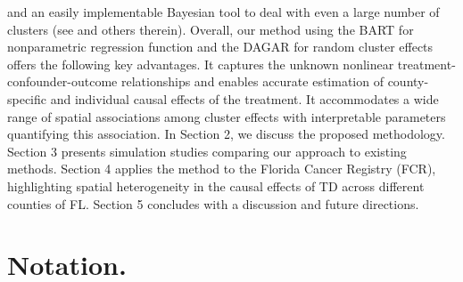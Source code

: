 \documentclass[aoas]{imsart}
\theoremstyle{plain}
\theoremstyle{definition}
\begin{document}
and an easily implementable Bayesian tool to deal with even a large number of clusters  (see \parencite{datta2019dagar, Besag1974lattice, Banerjee2014spatial, Wall2004spatial} and others therein). 
Overall, our method using the BART for nonparametric regression function and the DAGAR for random cluster effects offers the following key advantages. It captures the unknown nonlinear treatment-confounder-outcome relationships and enables accurate estimation of county-specific and individual causal effects of the treatment. It accommodates a wide range of spatial associations among cluster effects with interpretable parameters quantifying this association. In Section 2, we discuss the proposed methodology.
Section 3 presents simulation studies comparing our approach to existing methods. Section 4 applies the method to the Florida Cancer Registry (FCR), highlighting spatial heterogeneity in the causal effects of TD across different counties of FL. Section 5 concludes with a discussion and future directions.



\section{Notation.}
\end{document}
